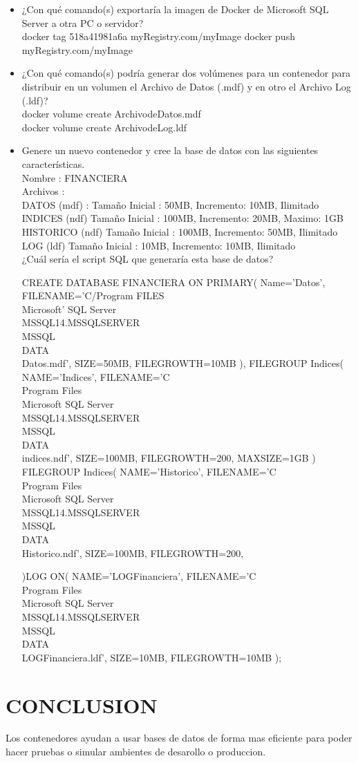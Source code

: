 \documentclass[preprint,12pt]{elsarticle}
\begin{document}
\begin{itemize}
	\item ¿Con qué comando(s) exportaría la imagen de Docker de Microsoft SQL Server a otra PC o servidor? \\
	docker tag 518a41981a6a myRegistry.com/myImage
	docker push myRegistry.com/myImage
	\item ¿Con qué comando(s) podría generar dos volúmenes para un contenedor para distribuir en un volumen el Archivo de Datos (.mdf) y en otro el Archivo Log (.ldf)?\\
	docker volume create ArchivodeDatos.mdf \\
	docker volume create ArchivodeLog.ldf
	\item Genere un nuevo contenedor y cree la base de datos con las siguientes características.\\
	Nombre : FINANCIERA\\
	Archivos : \\
	DATOS (mdf) : Tamaño Inicial : 50MB, Incremento: 10MB, Ilimitado \\
	INDICES (ndf) Tamaño Inicial : 100MB, Incremento: 20MB, Maximo: 1GB \\
	HISTORICO (ndf) Tamaño Inicial : 100MB, Incremento: 50MB, Ilimitado \\
	LOG (ldf) Tamaño Inicial : 10MB, Incremento: 10MB, Ilimitado \\
	¿Cuál sería el script SQL que generaría esta base de datos?
	
	CREATE DATABASE FINANCIERA ON
	PRIMARY(
		Name='Datos',
		FILENAME='C/Program FILES \\Microsoft' SQL Server \\ MSSQL14.MSSQLSERVER\\MSSQL\\DATA\\Datos.mdf',
		SIZE=50MB,
		FILEGROWTH=10MB
	),
	FILEGROUP Indices(
		NAME='Indices',
		FILENAME='C\\Program Files\\Microsoft SQL Server\\MSSQL14.MSSQLSERVER\\MSSQL\\DATA\\indices.ndf',
		SIZE=100MB,
		FILEGROWTH=200,
		MAXSIZE=1GB
	)
	FILEGROUP Indices(
		NAME='Historico',
		FILENAME='C\\Program Files\\Microsoft SQL Server\\MSSQL14.MSSQLSERVER\\MSSQL\\DATA\\Historico.ndf',
		SIZE=100MB,
		FILEGROWTH=200,
		
	)LOG ON(
		NAME='LOGFinanciera',
		FILENAME='C\\Program Files\\Microsoft SQL Server\\MSSQL14.MSSQLSERVER\\MSSQL\\DATA\\LOGFinanciera.ldf',
		SIZE=10MB,
		FILEGROWTH=10MB
);
	
	
\end{itemize}


\section{CONCLUSION}
Los contenedores ayudan a usar bases de datos de forma mas eficiente para poder hacer pruebas o simular ambientes de desarollo o produccion.
\end{document}
